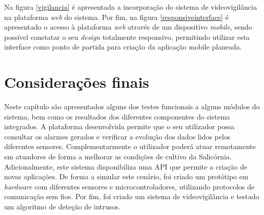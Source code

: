 \newpage

Na figura \ref{vigilancia} é apresentada a incorporação do sistema de videovigilância na plataforma \textit{web} do sistema. Por fim, na figura \ref{responsiveinterface} é apresentado o acesso à plataforma \textit{web} através de um dispositivo \textit{mobile}, sendo possível constatar o seu \textit{design} totalmente responsivo, permitindo utilizar esta interface como ponto de partida para criação da aplicação mobile planeada. 




\section{Considerações finais}



Neste capítulo são apresentados alguns dos testes funcionais a alguns módulos do sistema, bem como os resultados dos diferentes componentes do sistema integrados.  A plataforma desenvolvida permite que o seu utilizador possa consultar os alarmes gerados e verificar a evolução dos dados lidos pelos diferentes sensores. Complementarmente o utilizador poderá atuar remotamente em atuadores de forma a melhorar as condições de cultivo da Salicórnia. Adicionalmente, este sistema disponibiliza uma API que permite a criação de novas aplicações. De forma a simular este cenário, foi criado um protótipo em \textit{hardware} com diferentes sensores e microcontroladores, utilizando protocolos de comunicação sem fios. Por fim, foi criado um sistema de videovigilância e testado um algoritmo de deteção de intrusos. 


